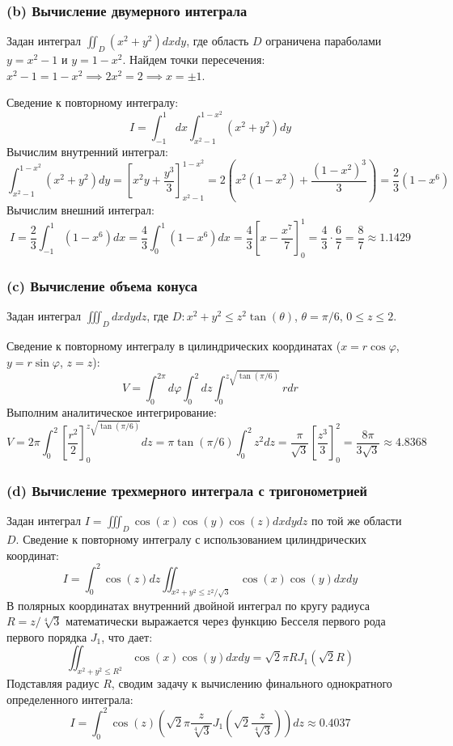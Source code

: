 \documentclass[a4paper]{article}
\begin{document}
\subsubsection*{(b) Вычисление двумерного интеграла}
Задан интеграл $\iint_{D}(x^{2}+y^{2})dxdy$, где область $D$ ограничена параболами $y = x^2 - 1$ и $y = 1 - x^2$.
Найдем точки пересечения: $x^2 - 1 = 1 - x^2 \implies 2x^2 = 2 \implies x = \pm 1$.

Сведение к повторному интегралу:
$$I = \int_{-1}^1 dx \int_{x^2-1}^{1-x^2} (x^2+y^2) dy$$
Вычислим внутренний интеграл:
$$\int_{x^2-1}^{1-x^2} (x^2+y^2) dy = \left[ x^2y + \frac{y^3}{3} \right]_{x^2-1}^{1-x^2} = 2 \left( x^2(1-x^2) + \frac{(1-x^2)^3}{3} \right) = \frac{2}{3} (1 - x^6)$$
Вычислим внешний интеграл:
$$I = \frac{2}{3} \int_{-1}^1 (1 - x^6) dx = \frac{4}{3} \int_0^1 (1 - x^6) dx = \frac{4}{3} \left[ x - \frac{x^7}{7} \right]_0^1 = \frac{4}{3} \cdot \frac{6}{7} = \frac{8}{7} \approx 1.1429$$

\subsubsection*{(c) Вычисление объема конуса}
Задан интеграл $\iiint_{D} dxdydz$, где $D: x^2+y^2 \le z^2 \tan(\theta)$, $\theta = \pi/6$, $0 \le z \le 2$.

Сведение к повторному интегралу в цилиндрических координатах ($x = r\cos\varphi$, $y = r\sin\varphi$, $z = z$):
$$V = \int_0^{2\pi} d\varphi \int_0^2 dz \int_0^{z\sqrt{\tan(\pi/6)}} r dr$$
Выполним аналитическое интегрирование:
$$V = 2\pi \int_0^2 \left[ \frac{r^2}{2} \right]_0^{z\sqrt{\tan(\pi/6)}} dz = \pi \tan(\pi/6) \int_0^2 z^2 dz = \frac{\pi}{\sqrt{3}} \left[ \frac{z^3}{3} \right]_0^2 = \frac{8\pi}{3\sqrt{3}} \approx 4.8368$$

\subsubsection*{(d) Вычисление трехмерного интеграла с тригонометрией}
Задан интеграл $I = \iiint_{D}\cos(x)\cos(y)\cos(z)dxdydz$ по той же области $D$.
Сведение к повторному интегралу с использованием цилиндрических координат:
$$I = \int_0^2 \cos(z) dz \iint_{x^2+y^2 \le z^2/\sqrt{3}} \cos(x)\cos(y) dx dy$$
В полярных координатах внутренний двойной интеграл по кругу радиуса $R = z/\sqrt[4]{3}$ математически выражается через функцию Бесселя первого рода первого порядка $J_1$, что дает:
$$\iint_{x^2+y^2 \le R^2} \cos(x)\cos(y) dx dy = \sqrt{2}\pi R J_1(\sqrt{2}R)$$
Подставляя радиус $R$, сводим задачу к вычислению финального однократного определенного интеграла:
$$I = \int_0^2 \cos(z) \left( \sqrt{2}\pi \frac{z}{\sqrt[4]{3}} J_1\left(\sqrt{2}\frac{z}{\sqrt[4]{3}}\right) \right) dz \approx 0.4037$$
\end{document}
